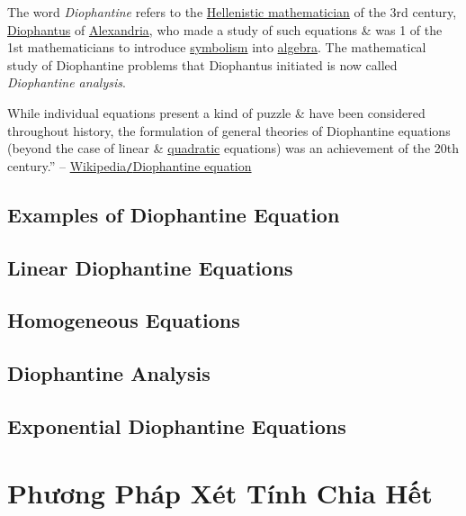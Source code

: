 \documentclass{article}
\numberwithin{equation}{section}
\begin{document}
The word \textit{Diophantine} refers to the \href{https://en.wikipedia.org/wiki/Greek_mathematics#Hellenistic}{Hellenistic mathematician} of the 3rd century, \href{https://en.wikipedia.org/wiki/Diophantus}{Diophantus} of \href{https://en.wikipedia.org/wiki/Alexandria}{Alexandria}, who made a study of such equations \& was 1 of the 1st mathematicians to introduce \href{https://en.wikipedia.org/wiki/Mathematical_symbol}{symbolism} into \href{https://en.wikipedia.org/wiki/Algebra}{algebra}. The mathematical study of Diophantine problems that Diophantus initiated is now called \textit{Diophantine analysis}.

While individual equations present a kind of puzzle \& have been considered throughout history, the formulation of general theories of Diophantine equations (beyond the case of linear \& \href{https://en.wikipedia.org/wiki/Quadratic_equation}{quadratic} equations) was an achievement of the 20th century.'' -- \href{https://en.wikipedia.org/wiki/Diophantine_equation}{Wikipedia\texttt{/}Diophantine equation}

\subsection{Examples of Diophantine Equation}

\subsection{Linear Diophantine Equations}

\subsection{Homogeneous Equations}

\subsection{Diophantine Analysis}

\subsection{Exponential Diophantine Equations}


\section{Phương Pháp Xét Tính Chia Hết}
\end{document}
